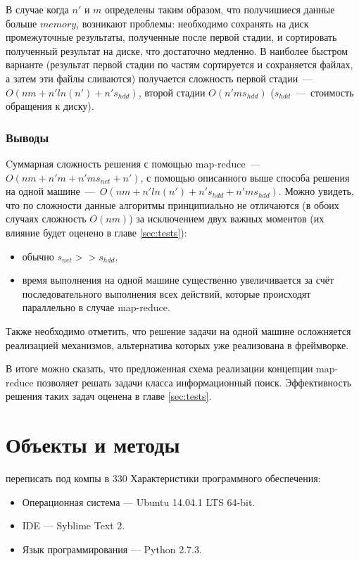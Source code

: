 \documentclass[12pt,a4paper,oneside]{extarticle}
\begin{document}
            В случае когда $n'$ и $m$ определены таким образом, что получишиеся данные больше $memory$, возникают проблемы: необходимо сохранять на диск промежуточные результаты, полученные после первой стадии, и сортировать полученный результат на диске, что достаточно медленно. В наиболее быстром варианте (результат первой стадии по частям сортируется и сохраняется файлах, а затем эти файлы сливаются) получается сложность первой стадии~---~$O(nm+n'ln(n')+n's_{hdd})$, второй стадии $O(n'ms_{hdd})$ ($s_{hdd}$~---~стоимость обращения к диску).

        \subsubsection{Выводы}
            Cуммарная сложность решения с помощью map-reduce~---~$O(nm+n'm+n'ms_{net}+n')$, с помощью описанного выше способа решения на одной машине~---~$O(nm+n'ln(n')+n's_{hdd}+n'ms_{hdd})$. Можно увидеть, что по сложности данные алгоритмы принципиально не отличаются (в обоих случаях сложность $O(nm)$) за исключением двух важных моментов (их влияние будет оценено в главе \ref{sec:tests}):
            \begin{itemize}
                \item обычно $s_{net}>>s_{hdd}$,
                \item время выполнения на одной машине существенно увеличивается за счёт последовательного выполнения всех действий, которые происходят параллельно в случае map-reduce.
            \end{itemize}

            Также необходимо отметить, что решение задачи на одной машине осложняется реализацией механизмов, альтернатива которых уже реализована в фреймворке. 

            В итоге можно сказать, что предложенная схема реализации концепции map-reduce позволяет решать задачи класса информационный поиск. Эффективность решения таких задач оценена в главе \ref{sec:tests}.
        
    \clearpage
\clearpage

\section{Объекты и методы} 
        переписать под компы в 330   
        \noindent Характеристики программного обеспечения:
        \begin{itemize}
            \item Операционная система --- Ubuntu 14.04.1 LTS 64-bit.
            \item IDE --- Syblime Text 2.
            \item Язык программирования --- Python 2.7.3.
        \end{itemize}
        
\end{document}
